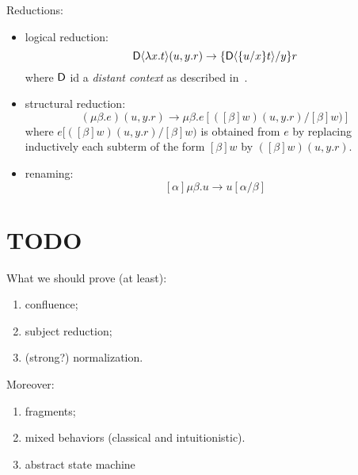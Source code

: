 Reductions:
\begin{itemize}
\item logical reduction:
\[\mathsf{D}\langle \lambda x.t\rangle(u,y.r)\to \{\mathsf{D}\langle\{u/x\}t\rangle/y\}r
\]
where $\mathsf{D}$ id a {\em distant context} as described in~\cite{DBLP:conf/fossacs/SantoKP22}.
\item  structural reduction: 
\[
(\mu\beta. e)(u,y.r) \to\mu\beta.e[([\beta]w)(u,y.r)/[\beta]w)]
\]
where $e[([\beta]w)(u,y.r)/[\beta]w)$ is obtained from $e$ by replacing inductively each subterm of the form $[\beta]w$ by $([\beta]w)(u,y.r)$.
\item renaming:
\[
[\alpha]\mu\beta.u\to u[\alpha/\beta]
\]
\end{itemize}



\section{TODO}
What we should prove (at least):
\begin{enumerate}
\item confluence;
\item subject reduction;
\item (strong?) normalization.
\end{enumerate}

Moreover: 
\begin{enumerate}
\item fragments;
\item mixed behaviors (classical and intuitionistic).
\item abstract state machine
\end{enumerate}
\fi